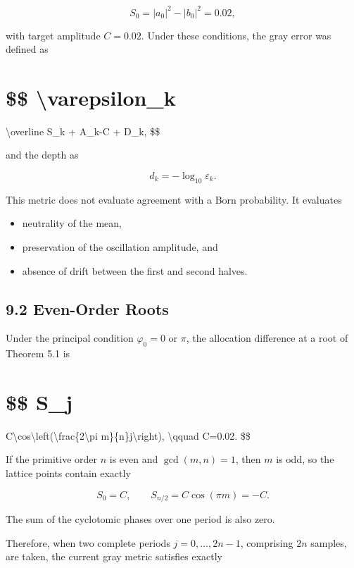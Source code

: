 \documentclass[
  a4paper,
  10pt]{article}
\providecommand{\tightlist}{%
  \setlength{\itemsep}{0pt}\setlength{\parskip}{0pt}}
\begin{document}
\[
S_0=|a_0|^2-|b_0|^2=0.02,
\]

with target amplitude \(C=0.02\). Under these conditions, the gray error
was defined as

\section{\$\$ \textbackslash varepsilon\_k}\label{-varepsilon_k}

\textbar\textbackslash overline S\_k\textbar{} +
\textbar A\_k-C\textbar{} + D\_k, \$\$

and the depth as

\[
d_k=-\log_{10}\varepsilon_k.
\]

This metric does not evaluate agreement with a Born probability. It
evaluates

\begin{itemize}
\tightlist
\item
  neutrality of the mean,
\item
  preservation of the oscillation amplitude, and
\item
  absence of drift between the first and second halves.
\end{itemize}

\subsection{9.2 Even-Order Roots}\label{92-even-order-roots}

Under the principal condition \(\varphi_0=0\) or \(\pi\), the allocation
difference at a root of Theorem 5.1 is

\section{\$\$ S\_j}\label{-s_j}

C\textbackslash cos\textbackslash left(\textbackslash frac\{2\textbackslash pi
m\}\{n\}j\textbackslash right), \textbackslash qquad C=0.02. \$\$

If the primitive order \(n\) is even and \(\gcd(m,n)=1\), then \(m\) is
odd, so the lattice points contain exactly

\[
S_0=C,
\qquad
S_{n/2}=C\cos(\pi m)=-C.
\]

The sum of the cyclotomic phases over one period is also zero.

Therefore, when two complete periods \(j=0,\ldots,2n-1\), comprising
\(2n\) samples, are taken, the current gray metric satisfies exactly
\end{document}
